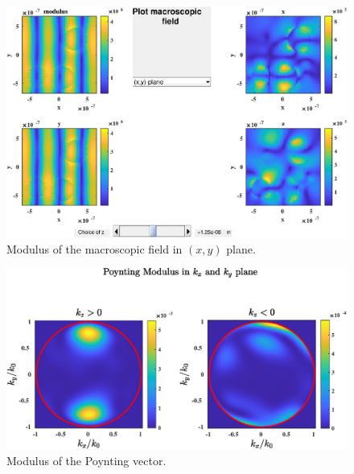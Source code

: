\begin{figure}[H]
\begin{center}
  \includegraphics*[width=15.0cm,draft=false]{test2macro.eps}
\end{center}
\caption{Modulus of the macroscopic field in $(x,y)$ plane.}
\end{figure}

\begin{figure}[H]
\begin{center}
  \includegraphics*[width=15.0cm,draft=false]{test2poynting2d.eps}
\end{center}
\caption{Modulus of the Poynting vector.}
\end{figure}


